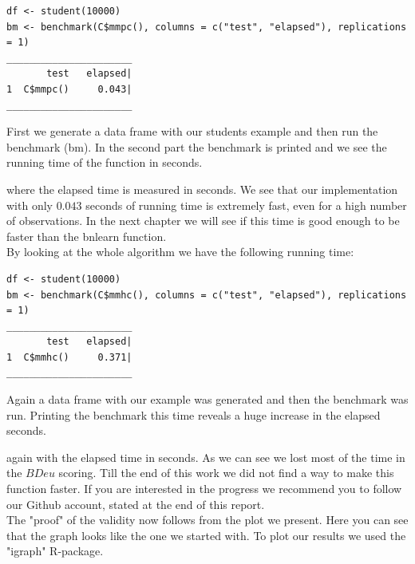 	\begin{program}
		\begin{snugshade}
  			\begin{verbatim}
df <- student(10000)
bm <- benchmark(C$mmpc(), columns = c("test", "elapsed"), replications = 1)
______________________
       test   elapsed|
1  C$mmpc()     0.043|
______________________
			\end{verbatim}
 		\end{snugshade}
		\caption{First we generate a data frame with our students example and then run the benchmark (bm). In the second part the benchmark is printed and we see the running time of the function in seconds.}
 	\end{program}
		
		where the elapsed time is measured in seconds. We see that our implementation with only $0.043$ seconds of running time is extremely fast, even for a high number of observations. In the next chapter we will see if this time is good enough to be faster than the bnlearn function.\\
		By looking at the whole algorithm we have the following running time:

	\begin{program}
		\begin{snugshade}
  			\begin{verbatim}
df <- student(10000)
bm <- benchmark(C$mmhc(), columns = c("test", "elapsed"), replications = 1)
______________________
       test   elapsed|
1  C$mmhc()     0.371|
______________________
			\end{verbatim}
 		\end{snugshade}
		\caption{Again a data frame with our example was generated and then the benchmark was run. Printing the benchmark this time reveals a huge increase in the elapsed seconds.}
 	\end{program}

		again with the elapsed time in seconds. As we can see we lost most of the time in the $BDeu$ scoring. Till the end of this work we did not find a way to make this function faster. If you are interested in the progress we recommend you to follow our Github account, stated at the end of this report.\\
		The "proof" of the validity now follows from the plot we present. Here you can see that the graph looks like the one we started with. To plot our results we used the "igraph" R-package.

		 \label{img.resultingGraph}

